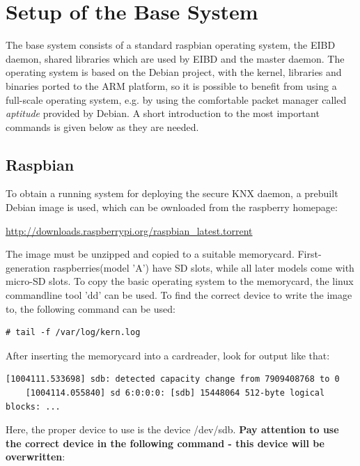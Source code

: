 

\section{Setup of the Base System}

The base system consists of a standard raspbian operating system, the EIBD daemon, shared libraries which are used by EIBD and the master daemon.
The operating system is based on the Debian project, with the kernel, libraries and binaries ported to the ARM platform, so it is possible to benefit from
using a full-scale operating system, e.g. by using the comfortable packet manager called
\textit{aptitude} provided by Debian. A short introduction to the most important commands is given below as they are needed.

\subsection{Raspbian}

To obtain a running system for deploying the secure KNX daemon, a prebuilt Debian image is used, which can be ownloaded from the raspberry homepage:

\url{http://downloads.raspberrypi.org/raspbian_latest.torrent}

The image must be unzipped and copied to a suitable memorycard. First-generation raspberries(model 'A') have SD slots, while
all later models come with micro-SD slots. To copy the basic operating system to the memorycard, the linux commandline tool 'dd' can
be used. To find the correct device to write the image to, the following command can be used: 

\begin{lstlisting}[style=BashInputStyle,label=lst:kern.log]
    # tail -f /var/log/kern.log
\end{lstlisting}

After inserting the memorycard into a cardreader, look for output like that:

\begin{lstlisting}[style=BashInputStyle]
    [1004111.533698] sdb: detected capacity change from 7909408768 to 0
    [1004114.055840] sd 6:0:0:0: [sdb] 15448064 512-byte logical blocks: ...
\end{lstlisting}

Here, the proper device to use is the device /dev/sdb.
\textbf{Pay attention to use the correct device in the following command - this device will be overwritten}:

